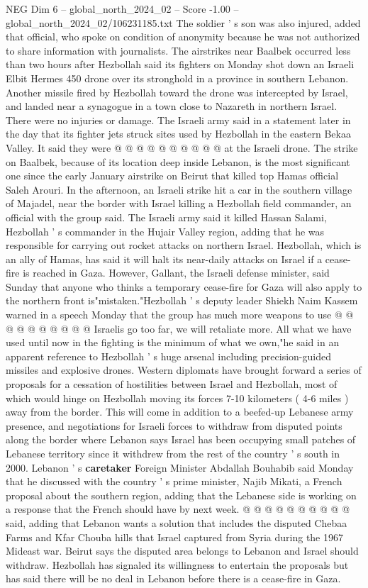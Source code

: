 \begin{textsample}{NEG Dim 6 – global\_north\_2024\_02 – Score -1.00 – global\_north\_2024\_02/106231185.txt}
The soldier ' s son was also injured, added that official, who spoke on condition of anonymity because he was not authorized to share information with journalists.
The airstrikes near Baalbek occurred less than two hours after Hezbollah said its fighters on Monday shot down an Israeli Elbit Hermes 450 drone over its stronghold in a province in southern Lebanon.
Another missile fired by Hezbollah toward the drone was intercepted by Israel, and landed near a synagogue in a town close to Nazareth in northern Israel.
There were no injuries or damage.
The Israeli army said in a statement later in the day that its fighter jets struck sites used by Hezbollah in the eastern Bekaa Valley.
It said they were @ @ @ @ @ @ @ @ @ @ at the Israeli drone.
The strike on Baalbek, because of its location deep inside Lebanon, is the most significant one since the early January airstrike on Beirut that killed top Hamas official Saleh Arouri.
In the afternoon, an Israeli strike hit a car in the southern village of Majadel, near the border with Israel killing a Hezbollah field commander, an official with the group said.
The Israeli army said it killed Hassan Salami, Hezbollah ' s commander in the Hujair Valley region, adding that he was responsible for carrying out rocket attacks on northern Israel.
Hezbollah, which is an ally of Hamas, has said it will halt its near-daily attacks on Israel if a cease-fire is reached in Gaza.
However, Gallant, the Israeli defense minister, said Sunday that anyone who thinks a temporary cease-fire for Gaza will also apply to the northern front is"mistaken."Hezbollah ' s deputy leader Shiekh Naim Kassem warned in a speech Monday that the group has much more weapons to use @ @ @ @ @ @ @ @ @ @ Israelis go too far, we will retaliate more.
All what we have used until now in the fighting is the minimum of what we own,"he said in an apparent reference to Hezbollah ' s huge arsenal including precision-guided missiles and explosive drones.
Western diplomats have brought forward a series of proposals for a cessation of hostilities between Israel and Hezbollah, most of which would hinge on Hezbollah moving its forces 7-10 kilometers ( 4-6 miles ) away from the border.
This will come in addition to a beefed-up Lebanese army presence, and negotiations for Israeli forces to withdraw from disputed points along the border where Lebanon says Israel has been occupying small patches of Lebanese territory since it withdrew from the rest of the country ' s south in 2000.
Lebanon ' s \textbf{caretaker} Foreign Minister Abdallah Bouhabib said Monday that he discussed with the country ' s prime minister, Najib Mikati, a French proposal about the southern region, adding that the Lebanese side is working on a response that the French should have by next week. @ @ @ @ @ @ @ @ @ @ said, adding that Lebanon wants a solution that includes the disputed Chebaa Farms and Kfar Chouba hills that Israel captured from Syria during the 1967 Mideast war.
Beirut says the disputed area belongs to Lebanon and Israel should withdraw.
Hezbollah has signaled its willingness to entertain the proposals but has said there will be no deal in Lebanon before there is a cease-fire in Gaza.

\end{textsample}
